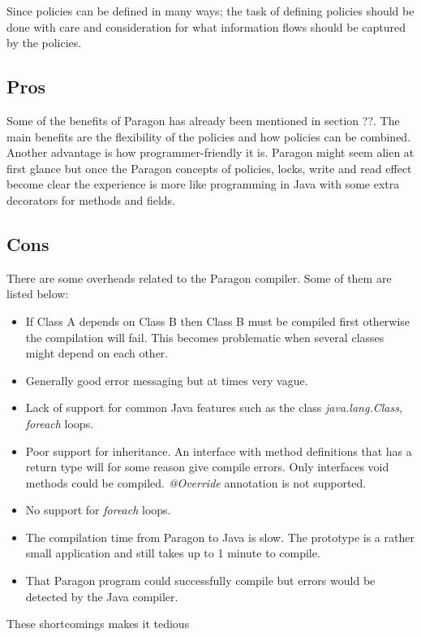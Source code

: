 Since policies can be defined in many ways; the task of defining policies should be done with care and consideration for what information flows should be captured by the policies.


\subsection{Pros}
Some of the benefits of Paragon has already been mentioned in section ??. The main benefits are the flexibility of the policies and how policies can be combined. Another advantage is how programmer-friendly it is. Paragon might seem alien at first glance but once the Paragon concepts of policies, locks, write and read effect become clear the experience is more like programming in Java with some extra decorators for methods and fields.

\subsection{Cons}
There are some overheads related to the Paragon compiler. Some of them are listed below:

\begin{itemize}
	\item If Class A depends on Class B then Class B must be compiled first otherwise the compilation will fail. This becomes problematic when several classes might depend on each other. 
	\item Generally good error messaging but at times very vague. 	
	\item Lack of support for common Java features such as the class \emph{java.lang.Class},  \emph{foreach} loops.
	\item Poor support for inheritance. An interface with method definitions that has a return type will for some reason give compile errors. Only interfaces void methods could be compiled. \emph{@Override} annotation is not supported.
	\item No support for \emph{foreach} loops.
	\item The compilation time from Paragon to Java is slow. The prototype is a rather small application and still takes up to 1 minute to compile.
	\item That Paragon program could successfully compile but errors would be detected by the Java compiler.
\end{itemize} 

These shortcomings makes it tedious 




